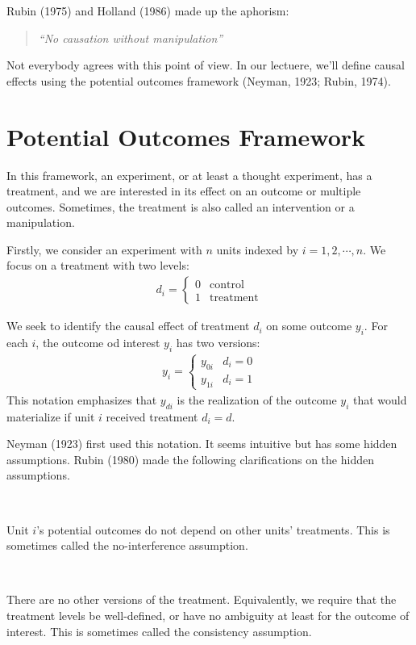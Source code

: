 Rubin (1975\cite{rubin1975bayesian}) and Holland (1986\cite{holland1986statistics}) made up the aphorism\cite{ding2023causalinference}:
\begin{quote}
  \textit{``No causation without manipulation''}
\end{quote}
Not everybody agrees with this point of view. In our lectuere, we'll define causal effects using the potential outcomes framework
(Neyman, 1923\cite{neyman1923experiment}; Rubin, 1974\cite{rubin1974estimating}).


\section{Potential Outcomes Framework}

In this framework, an experiment, or at least a thought experiment, 
has a treatment, and we are interested in its effect on an outcome 
or multiple outcomes. Sometimes, the treatment is also called an
intervention or a manipulation.

Firstly, we consider an experiment with $n$ units indexed by $i=1, 2, \cdots, n$.
We focus on a treatment with two levels:
\begin{gather*}
  d_i = \left\{\begin{matrix}
    0 & \text{control}\\
    1 & \text{treatment}
  \end{matrix} \right.
\end{gather*}

We seek to identify the causal effect of treatment $d_i$ on some outcome $y_i$.
For each $i$, the outcome od interest $y_i$ has two versions:
\begin{gather*}
  y_i = \left\{\begin{matrix}
    y_{0i} & d_i=0\\
    y_{1i} & d_i=1
  \end{matrix} \right.
\end{gather*}
This notation emphasizes that $y_{di}$ is the realization of the outcome $y_i$ that would materialize if unit $i$
received treatment $d_i = d$.

Neyman (1923\cite{neyman1923experiment}) first used this notation. It seems intuitive but has some hidden
assumptions. Rubin (1980\cite{rubin1980comment}) made the following clarifications on the hidden assumptions.
\begin{assumption}[No interference]\label{assumption:no_interference}
  \

  Unit $i$'s potential outcomes do not depend on other units' treatments. 
  This is sometimes called the no-interference assumption.
\end{assumption}
\begin{assumption}[Consistency]\label{assumption:consistency}
  \

  There are no other versions of the treatment. 
  Equivalently, we require that the treatment levels be well-defined, 
  or have no ambiguity at least for the outcome of interest. 
  This is sometimes called the consistency assumption.
\end{assumption}

